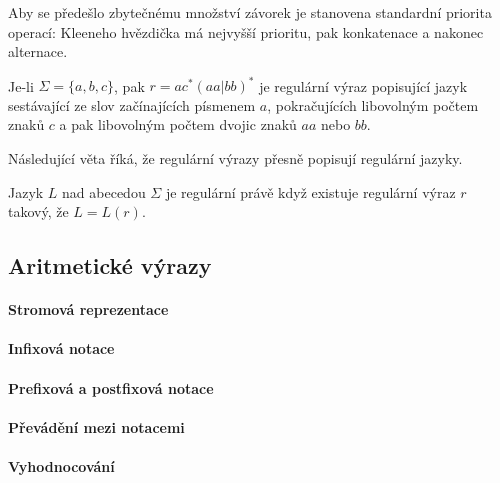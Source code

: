 Aby se předešlo zbytečnému množství závorek je stanovena standardní priorita operací: Kleeneho  hvězdička má nejvyšší prioritu, pak konkatenace a
nakonec alternace. 

\begin{example} Je-li \(\Sigma=\{a,b,c\}\), pak \(r=ac^*(aa|bb)^*\) je regulární výraz popisující jazyk sestávající ze slov začínajících písmenem \(a\), pokračujících libovolným počtem znaků \(c\)
a pak libovolným počtem dvojic znaků \(aa\) nebo \(bb\).
\end{example}

Následující věta říká, že regulární výrazy přesně popisují regulární jazyky.

\begin{theorem} Jazyk \(L\) nad abecedou \(\Sigma\) je regulární právě když existuje regulární výraz \(r\) takový, že \(L=L(r)\).
\end{theorem}


\subsection*{Aritmetické výrazy}

\paragraph{Stromová reprezentace}
\paragraph{Infixová notace}
\paragraph{Prefixová a postfixová notace}
\paragraph{Převádění mezi notacemi}
\paragraph{Vyhodnocování}

\ifx\ucebnice\undefined

\fi
